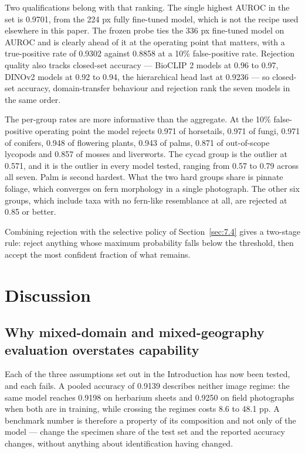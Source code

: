 \documentclass[preprint,12pt,authoryear]{elsarticle}
\begin{document}
Two qualifications belong with that ranking. The single highest AUROC in the set is 0.9701, from the 224 px fully fine-tuned model, which is not the recipe used elsewhere in this paper. The frozen probe ties the 336 px fine-tuned model on AUROC and is clearly ahead of it at the operating point that matters, with a true-positive rate of 0.9302 against 0.8858 at a 10\% false-positive rate. Rejection quality also tracks closed-set accuracy --- BioCLIP 2 models at 0.96 to 0.97, DINOv2 models at 0.92 to 0.94, the hierarchical head last at 0.9236 --- so closed-set accuracy, domain-transfer behaviour and rejection rank the seven models in the same order.

The per-group rates are more informative than the aggregate. At the 10\% false-positive operating point the model rejects 0.971 of horsetails, 0.971 of fungi, 0.971 of conifers, 0.948 of flowering plants, 0.943 of palms, 0.871 of out-of-scope lycopods and 0.857 of mosses and liverworts. The cycad group is the outlier at 0.571, and it is the outlier in every model tested, ranging from 0.57 to 0.79 across all seven. Palm is second hardest. What the two hard groups share is pinnate foliage, which converges on fern morphology in a single photograph. The other six groups, which include taxa with no fern-like resemblance at all, are rejected at 0.85 or better.

Combining rejection with the selective policy of Section~\ref{sec:7.4} gives a two-stage rule: reject anything whose maximum probability falls below the threshold, then accept the most confident fraction of what remains.

\setcounter{section}{9}

\section{Discussion}\label{sec:10}

\setcounter{section}{10}

\setcounter{subsection}{0}

\subsection{Why mixed-domain and mixed-geography evaluation overstates capability}\label{sec:10.1}

Each of the three assumptions set out in the Introduction has now been tested, and each fails. A pooled accuracy of 0.9139 describes neither image regime: the same model reaches 0.9198 on herbarium sheets and 0.9250 on field photographs when both are in training, while crossing the regimes costs 8.6 to 48.1 pp. A benchmark number is therefore a property of its composition and not only of the model --- change the specimen share of the test set and the reported accuracy changes, without anything about identification having changed.
\end{document}
